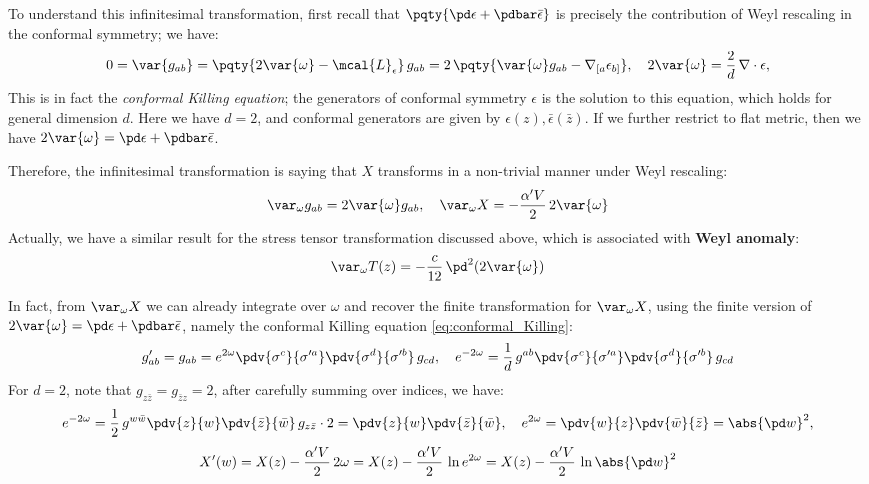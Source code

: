 \documentclass[a4paper
	,10pt
]{article}
\begin{document}
	To understand this infinitesimal transformation, first recall that $
		\pqty{
			\pd\epsilon
			+ \pdbar\bar{\epsilon}
		}
	$ is precisely the contribution of Weyl rescaling in the conformal symmetry; we have:
	\begin{equation}
		0 = \var{g_{ab}}
		= \pqty{2\var{\omega} - \mcal{L}_\epsilon}\,
			g_{ab}
		= 2\,\pqty{
				\var{\omega} g_{ab}
				- \nabla_{[a} \epsilon_{b]}
			},
	\quad
		2\var{\omega}
		= \frac{2}{d}\,\nabla\cdot\epsilon,
	\label{eq:conformal_Killing}
	\end{equation}
	This is in fact the \textit{conformal Killing equation}; the generators of conformal symmetry $\epsilon$ is the solution to this equation, which holds for general dimension $d$. 
	Here we have $d = 2$, and conformal generators are given by $\epsilon(z), \bar{\epsilon}(\bar{z})$. If we further restrict to flat metric, then we have $
		2\var{\omega}
		= \pd\epsilon
			+ \pdbar\bar{\epsilon}
	$. 
	
	Therefore, the infinitesimal transformation is saying that $X$ transforms in a non-trivial manner under Weyl rescaling:
	\begin{equation}
		\var_\omega g_{ab} = 2\var{\omega} g_{ab},
	\quad
		\var_\omega X
		= - \frac{\alpha' V}{2}\, 2\var{\omega}
	\end{equation}
	Actually, we have a similar result for the stress tensor transformation discussed above, which is associated with \textbf{Weyl anomaly}:
	\begin{equation}
		\var_\omega T(z)
		= - \frac{c}{12}\,\pd^2 (2\var{\omega})
	\end{equation}
	
	In fact, from $\var_\omega {X}$ we can already integrate over $\omega$ and recover the finite transformation for $\var_\omega {X}$, using the finite version of $
		2\var{\omega}
		= \pd\epsilon
			+ \pdbar\bar{\epsilon}
	$, namely the conformal Killing equation \eqref{eq:conformal_Killing}:
	\begin{equation}
		g'_{ab}
		= g_{ab}
		= e^{2\omega} \pdv{\sigma^c}{\sigma'^a}
			\pdv{\sigma^d}{\sigma'^b}\,g_{cd},
	\quad
		e^{-2\omega}
		= \frac{1}{d}\,
			g^{ab}
			\pdv{\sigma^c}{\sigma'^a}
			\pdv{\sigma^d}{\sigma'^b}
			\,g_{cd}
	\end{equation}
	For $d = 2$, note that $g_{z\bar{z}} = g_{\bar{z}z} = 2$, after carefully summing over indices, we have:
	\begin{equation}
		e^{-2\omega}
		= \frac{1}{2}\, g^{w\bar{w}}
			\pdv{z}{w}
			\pdv{\bar{z}}{\bar{w}}\,
			g_{z\bar{z}} \cdot 2
		= \pdv{z}{w} \pdv{\bar{z}}{\bar{w}},
	\quad
		e^{2\omega}
		= \pdv{w}{z} \pdv{\bar{w}}{\bar{z}}
		= \abs{\pd w}^2,
	\end{equation}
	\vspace{-.5\baselineskip}
	\begin{equation}
		X'(w)
		= X(z) - \frac{\alpha' V}{2}\, 2\omega
		= X(z) - \frac{\alpha' V}{2}\, \ln e^{2\omega}
		= X(z) - \frac{\alpha' V}{2}\, \ln \abs{\pd w}^2
	\label{eq:finite_Weyl}
	\end{equation}
\end{document}

